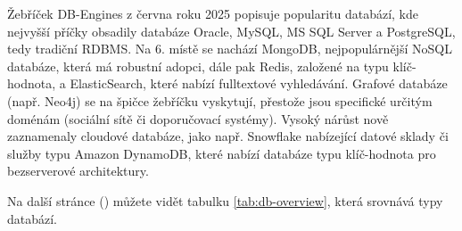 Žebříček DB-Engines z června roku 2025 popisuje popularitu databází,
kde nejvyšší příčky obsadily databáze Oracle, MySQL, MS SQL Server
a PostgreSQL, tedy tradiční RDBMS. Na 6. místě se nachází MongoDB,
nejpopulárnější NoSQL databáze, která má robustní adopci, dále pak
Redis, založené na typu klíč-hodnota, a ElasticSearch, které nabízí
fulltextové vyhledávání. Grafové databáze (např. Neo4j) se na špičce
žebříčku vyskytují, přestože jsou specifické určitým doménám
(sociální sítě či doporučovací systémy). Vysoký nárůst nově zaznamenaly
cloudové databáze, jako např. Snowflake nabízející datové sklady či služby
typu Amazon DynamoDB, které nabízí databáze typu klíč-hodnota
pro bezserverové architektury. \cite{YHVfLHsNlUItkF6G,gT0jW3Rz4pdfcjnO}

Na další stránce (\pageref{tab:db-overview}) můžete vidět
tabulku \ref{tab:db-overview}, která srovnává typy databází.

\clearpage

